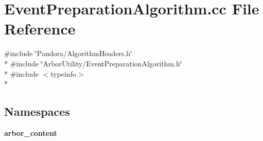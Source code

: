 \section{Event\+Preparation\+Algorithm.\+cc File Reference}
\label{EventPreparationAlgorithm_8cc}
{\ttfamily \#include \char`\"{}Pandora/\+Algorithm\+Headers.\+h\char`\"{}}\\*
{\ttfamily \#include \char`\"{}Arbor\+Utility/\+Event\+Preparation\+Algorithm.\+h\char`\"{}}\\*
{\ttfamily \#include $<$typeinfo$>$}\\*
\subsection*{Namespaces}
\begin{DoxyCompactItemize}
\item 
 {\bf arbor\+\_\+content}
\end{DoxyCompactItemize}
